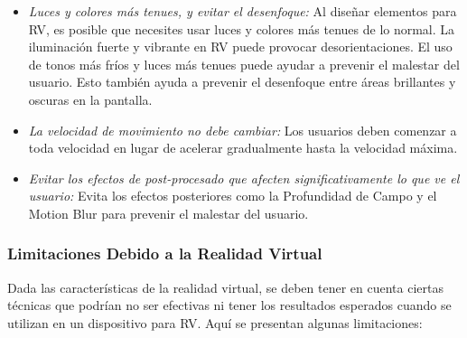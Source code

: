 \begin{itemize}
\begin{itemize}
                    \item \textit{Luces y colores más tenues, y evitar el desenfoque:} Al diseñar elementos para RV, es posible que necesites usar luces y colores más tenues de lo normal. La iluminación fuerte y vibrante en RV puede provocar desorientaciones. El uso de tonos más fríos y luces más tenues puede ayudar a prevenir el malestar del usuario. Esto también ayuda a prevenir el desenfoque entre áreas brillantes y oscuras en la pantalla.
                    
                    \item \textit{La velocidad de movimiento no debe cambiar:} Los usuarios deben comenzar a toda velocidad en lugar de acelerar gradualmente hasta la velocidad máxima.
                    
                    \item \textit{Evitar los efectos de post-procesado que afecten significativamente lo que ve el usuario:} Evita los efectos posteriores como la Profundidad de Campo y el Motion Blur para prevenir el malestar del usuario.
                \end{itemize}
            \end{itemize}


            \subsubsection{Limitaciones Debido a la Realidad Virtual}
            Dada las características de la realidad virtual, se deben tener en cuenta ciertas técnicas que podrían no ser efectivas ni tener los resultados esperados cuando se utilizan en un dispositivo para RV. Aquí se presentan algunas limitaciones: \cite{unrealengineVR}


